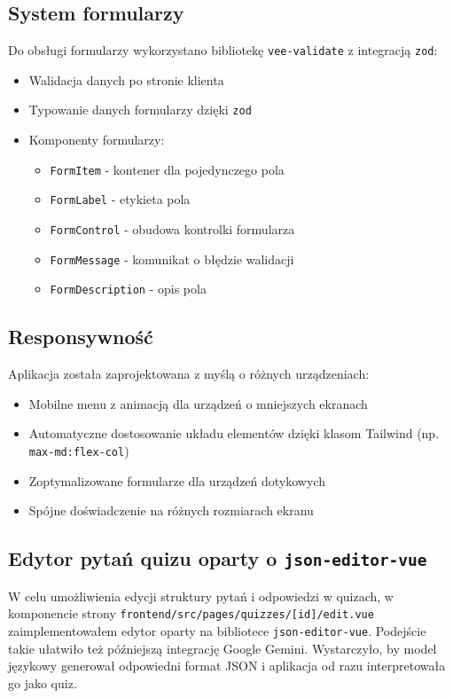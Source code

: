 \documentclass{article}
\begin{document}
      \subsection{System formularzy}
        Do obsługi formularzy wykorzystano bibliotekę \texttt{vee-validate} z integracją \texttt{zod}:
        \begin{itemize}
          \item Walidacja danych po stronie klienta
          \item Typowanie danych formularzy dzięki \texttt{zod}
          \item Komponenty formularzy:
            \begin{itemize}
              \item \texttt{FormItem} - kontener dla pojedynczego pola
              \item \texttt{FormLabel} - etykieta pola
              \item \texttt{FormControl} - obudowa kontrolki formularza
              \item \texttt{FormMessage} - komunikat o błędzie walidacji
              \item \texttt{FormDescription} - opis pola
            \end{itemize}
        \end{itemize}
    
      \subsection{Responsywność}
        Aplikacja została zaprojektowana z myślą o różnych urządzeniach:
        \begin{itemize}
          \item Mobilne menu z animacją dla urządzeń o mniejszych ekranach
          \item Automatyczne dostosowanie układu elementów dzięki klasom Tailwind (np. \texttt{max-md:flex-col})
          \item Zoptymalizowane formularze dla urządzeń dotykowych
          \item Spójne doświadczenie na różnych rozmiarach ekranu
        \end{itemize}

        \subsection{Edytor pytań quizu oparty o \texttt{json-editor-vue}}
        W celu umożliwienia edycji struktury pytań i odpowiedzi w quizach, w komponencie strony \texttt{frontend/src/pages/quizzes/[id]/edit.vue} zaimplementowałem edytor oparty na bibliotece \texttt{json-editor-vue}. Podejście takie ułatwiło też późniejszą integrację Google Gemini. Wystarczyło, by model językowy generował odpowiedni format JSON i aplikacja od razu interpretowała go jako quiz.
        
\end{document}
